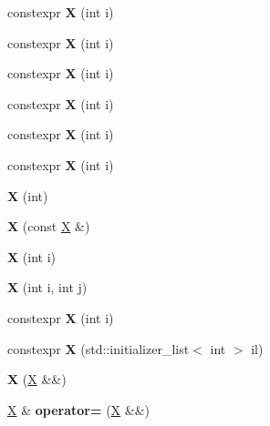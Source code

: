 \begin{DoxyCompactItemize}
constexpr {\bfseries X} (int i)
\item 
\mbox{\label{class_x_acb10a534a7ab0dafa80c9ff2401e41bf}} 
constexpr {\bfseries X} (int i)
\item 
\mbox{\label{class_x_acb10a534a7ab0dafa80c9ff2401e41bf}} 
constexpr {\bfseries X} (int i)
\item 
\mbox{\label{class_x_acb10a534a7ab0dafa80c9ff2401e41bf}} 
constexpr {\bfseries X} (int i)
\item 
\mbox{\label{class_x_acb10a534a7ab0dafa80c9ff2401e41bf}} 
constexpr {\bfseries X} (int i)
\item 
\mbox{\label{class_x_acb10a534a7ab0dafa80c9ff2401e41bf}} 
constexpr {\bfseries X} (int i)
\item 
\mbox{\label{class_x_a36e9aecdd69489f3436c834184070c09}} 
{\bfseries X} (int)
\item 
\mbox{\label{class_x_a02ee09775690a43c8afadcf4b1f80530}} 
{\bfseries X} (const \mbox{\hyperlink{class_x}{X}} \&)
\item 
\mbox{\label{class_x_ab821891e399ee066c77b3234b63f128f}} 
{\bfseries X} (int i)
\item 
\mbox{\label{class_x_a4caaa01cb52b2e3045565ae9f4320ebb}} 
{\bfseries X} (int i, int j)
\item 
\mbox{\label{class_x_acb10a534a7ab0dafa80c9ff2401e41bf}} 
constexpr {\bfseries X} (int i)
\item 
\mbox{\label{class_x_a59ccd6990791e60f6f4e0d4075ca21c3}} 
constexpr {\bfseries X} (std\+::initializer\+\_\+list$<$ int $>$ il)
\item 
\mbox{\label{class_x_a4aee738a743f3db8533ccc106b68e7d8}} 
{\bfseries X} (\mbox{\hyperlink{class_x}{X}} \&\&)
\item 
\mbox{\label{class_x_a1516fdc0bcf4c8de818fe7bbdb2e7931}} 
\mbox{\hyperlink{class_x}{X}} \& {\bfseries operator=} (\mbox{\hyperlink{class_x}{X}} \&\&)

\end{DoxyCompactItemize}
